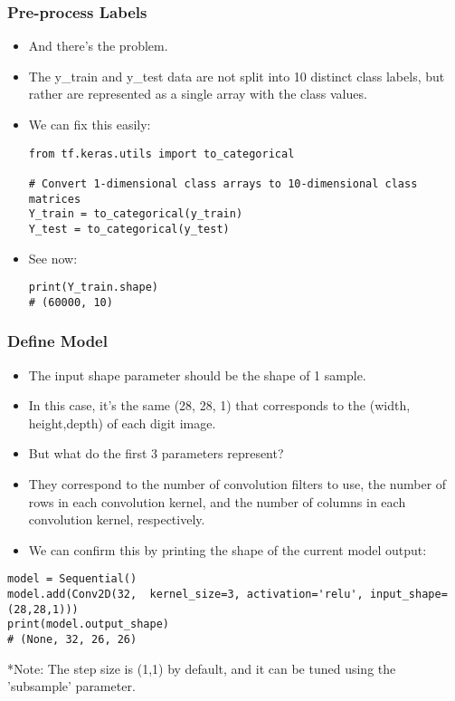 \begin{frame}[fragile] \frametitle{Pre-process Labels}

\begin{itemize}
\item And there's the problem. 
\item The y\_train and y\_test data are not split into 10 distinct class labels, but rather are represented as a single array with the class values.
\item We can fix this easily:
\begin{lstlisting}
from tf.keras.utils import to_categorical

# Convert 1-dimensional class arrays to 10-dimensional class matrices
Y_train = to_categorical(y_train)
Y_test = to_categorical(y_test)
\end{lstlisting}
\item See now:
\begin{lstlisting}
print(Y_train.shape)
# (60000, 10)
\end{lstlisting}
\end{itemize}
\end{frame}


\begin{frame}[fragile] \frametitle{Define Model}

\begin{itemize}
\item The input shape parameter should be the shape of 1 sample. 
\item In this case, it's the same (28, 28, 1) that corresponds to  the (width, height,depth) of each digit image.
\item But what do the first 3 parameters represent? 
\item They correspond to the number of convolution filters to use, the number of rows in each convolution kernel, and the number of columns in each convolution kernel, respectively.
\item We can confirm this by printing the shape of the current model output:
\end{itemize}
\begin{lstlisting}
model = Sequential()
model.add(Conv2D(32,  kernel_size=3, activation='relu', input_shape=(28,28,1)))
print(model.output_shape)
# (None, 32, 26, 26)
\end{lstlisting}
*Note: The step size is (1,1) by default, and it can be tuned using the 'subsample' parameter.
\end{frame}



